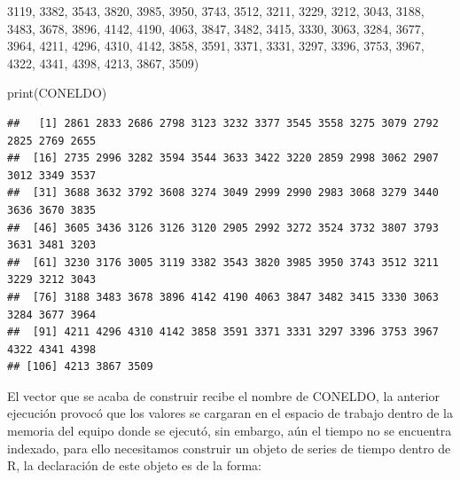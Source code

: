 \documentclass[
  spanish,
]{book}
\newenvironment{Shaded}{\begin{snugshade}}{\end{snugshade}}
\newcommand{\DecValTok}[1]{\textcolor[rgb]{0.00,0.00,0.81}{#1}}
\newcommand{\FunctionTok}[1]{\textcolor[rgb]{0.00,0.00,0.00}{#1}}
\newcommand{\NormalTok}[1]{#1}
\theoremstyle{remark}
\begin{document}
\begin{Shaded}
\begin{Highlighting}[]
          \DecValTok{3119}\NormalTok{, }\DecValTok{3382}\NormalTok{,   }\DecValTok{3543}\NormalTok{,   }\DecValTok{3820}\NormalTok{,   }\DecValTok{3985}\NormalTok{,   }\DecValTok{3950}\NormalTok{,   }\DecValTok{3743}\NormalTok{,   }\DecValTok{3512}\NormalTok{,   }\DecValTok{3211}\NormalTok{,}
          \DecValTok{3229}\NormalTok{, }\DecValTok{3212}\NormalTok{,   }\DecValTok{3043}\NormalTok{,   }\DecValTok{3188}\NormalTok{,   }\DecValTok{3483}\NormalTok{,   }\DecValTok{3678}\NormalTok{,   }\DecValTok{3896}\NormalTok{,   }\DecValTok{4142}\NormalTok{,   }\DecValTok{4190}\NormalTok{,   }
          \DecValTok{4063}\NormalTok{, }\DecValTok{3847}\NormalTok{,   }\DecValTok{3482}\NormalTok{,   }\DecValTok{3415}\NormalTok{,   }\DecValTok{3330}\NormalTok{,   }\DecValTok{3063}\NormalTok{,   }\DecValTok{3284}\NormalTok{, }\DecValTok{3677}\NormalTok{, }\DecValTok{3964}\NormalTok{,}
          \DecValTok{4211}\NormalTok{, }\DecValTok{4296}\NormalTok{,   }\DecValTok{4310}\NormalTok{,   }\DecValTok{4142}\NormalTok{,   }\DecValTok{3858}\NormalTok{,   }\DecValTok{3591}\NormalTok{,   }\DecValTok{3371}\NormalTok{,   }\DecValTok{3331}\NormalTok{,   }\DecValTok{3297}\NormalTok{,}
          \DecValTok{3396}\NormalTok{, }\DecValTok{3753}\NormalTok{,   }\DecValTok{3967}\NormalTok{,   }\DecValTok{4322}\NormalTok{,   }\DecValTok{4341}\NormalTok{,   }\DecValTok{4398}\NormalTok{,   }\DecValTok{4213}\NormalTok{,   }\DecValTok{3867}\NormalTok{,   }\DecValTok{3509}\NormalTok{)}

\FunctionTok{print}\NormalTok{(CONELDO)}
\end{Highlighting}
\end{Shaded}

\begin{verbatim}
##   [1] 2861 2833 2686 2798 3123 3232 3377 3545 3558 3275 3079 2792 2825 2769 2655
##  [16] 2735 2996 3282 3594 3544 3633 3422 3220 2859 2998 3062 2907 3012 3349 3537
##  [31] 3688 3632 3792 3608 3274 3049 2999 2990 2983 3068 3279 3440 3636 3670 3835
##  [46] 3605 3436 3126 3126 3120 2905 2992 3272 3524 3732 3807 3793 3631 3481 3203
##  [61] 3230 3176 3005 3119 3382 3543 3820 3985 3950 3743 3512 3211 3229 3212 3043
##  [76] 3188 3483 3678 3896 4142 4190 4063 3847 3482 3415 3330 3063 3284 3677 3964
##  [91] 4211 4296 4310 4142 3858 3591 3371 3331 3297 3396 3753 3967 4322 4341 4398
## [106] 4213 3867 3509
\end{verbatim}

El vector que se acaba de construir recibe el nombre de CONELDO, la anterior ejecución provocó que los valores se cargaran en el espacio de trabajo dentro de la memoria del equipo donde se ejecutó, sin embargo, aún el tiempo no se encuentra indexado, para ello necesitamos construir un objeto de series de tiempo dentro de R, la declaración de este objeto es de la forma:
\end{document}
